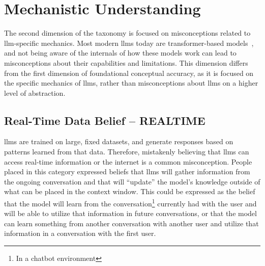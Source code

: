 \section{Mechanistic Understanding}
The second dimension of the taxonomy is focused on misconceptions related to \gls{llm}-specific mechanics. Most modern \gls{llms} today are transformer-based models~\cite{vaswani_attention_2017}, and not being aware of the internals of how these models work can lead to misconceptions about their capabilities and limitations. This dimension differs from the first dimension of foundational conceptual accuracy, as it is focused on the specific mechanics of \gls{llms}, rather than misconceptions about \gls{llms} on a higher level of abstraction.

\subsection{Real-Time Data Belief -- REALTIME}\label{realtime}
\gls{llms} are trained on large, fixed datasets, and generate responses based on patterns learned from that data. Therefore, mistakenly believing that \gls{llms} can access real-time information or the internet is a common misconception. People placed in this category expressed beliefs that \gls{llms} will gather information from the ongoing conversation and that will ``update'' the model's knowledge outside of what can be placed in the context window. This could be expressed as the belief that the model will learn from the conversation\footnote{In a chatbot environment} currently had with the user and will be able to utilize that information in future conversations, or that the model can learn something from another conversation with another user and utilize that information in a conversation with the first user. 


